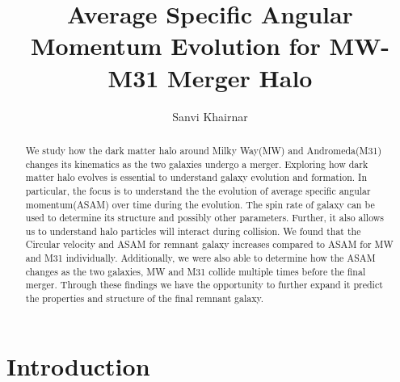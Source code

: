 \documentclass[twocolumn]{aastex631}
\begin{document}
\title{Average Specific Angular Momentum Evolution for MW-M31 Merger Halo}


\author{Sanvi Khairnar}

 
\begin{abstract}
We study how the dark matter halo around Milky Way(MW) and Andromeda(M31) changes its kinematics as the two galaxies undergo a merger. Exploring how dark matter halo evolves is essential to understand galaxy evolution and formation. In particular, the focus is to understand the the evolution of average specific angular momentum(ASAM) over time during the evolution. The spin rate of galaxy can be used to determine its structure and possibly other parameters. Further, it also allows us to understand halo particles will interact during collision. We found that the Circular velocity and ASAM for remnant galaxy increases compared to ASAM for MW and M31 individually. Additionally, we were also able to determine how the ASAM changes as the two galaxies, MW and M31 collide multiple times before the final merger. Through these findings we have the opportunity to further expand it predict the properties and structure of the final remnant galaxy.

\end{abstract}

\section{Introduction} \label{sec:intro}
\end{document}
